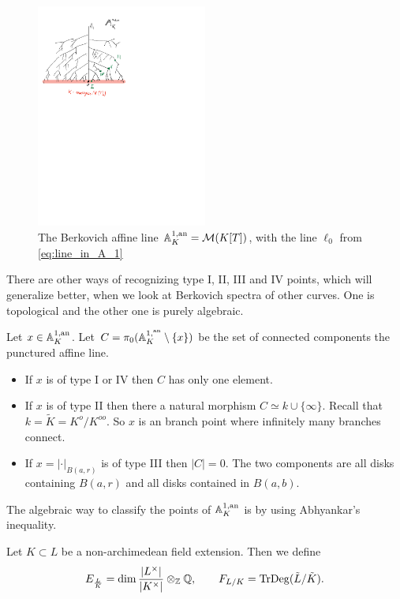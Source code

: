 \begin{figure}[h]
	\centering
	\includegraphics[width=0.5\textwidth]{figures/affine_line}
	\caption{The Berkovich affine line $\mathbb{A}_K^{1, \text{an}} = \mathcal{M} (K[T])$, with the line $\ell_0$ from \cref{eq:line_in_A_1}}
	\label{fig:affine_line}
\end{figure}

There are other ways of recognizing type I, II, III and IV points, which will generalize better, when we look at Berkovich spectra of other curves. One is topological and the other one is purely algebraic. 

\begin{proposition}
	Let $x \in \mathbb{A}_K^{1,\text{an}}$. 
	Let $C = \pi_0(\mathbb{A}_K^{1, {}^{\text{an}}}\setminus \{ x\} )$ be the set of connected components the punctured affine line. 
	\begin{itemize}
		\item If $x$ is of type I  or IV then $C$ has only one element.
		\item If $x$ is of type II then there a natural morphism $C \simeq k \cup \{\infty\} $. Recall that $k = \tilde K = K^{o} / K^{oo} $. 
			So $x$ is an branch point where infinitely many branches connect. 
		\item If $x = |\cdot |_{B(a, r)}$ is of type III then $|C| = 0$. The two components are all disks containing $B(a, r)$ and all disks contained in $B(a, b)$. 
	\end{itemize}
\end{proposition}
The algebraic way to classify the points of $\mathbb{A}_K^{1,\text{an}}$ is by using Abhyankar's inequality. 
\begin{definition}
	Let $K \subset L$ be a non-archimedean field extension. 
	Then we define \[
		E_{\frac{L}{ K}} = \dim \frac{|L^{\times }|}{|K^{\times }|} \otimes_{\mathbb{Z}} \mathbb{Q}, \qquad F_{L / K} = \operatorname{TrDeg}(\tilde L / \tilde K)
	.\] 
\end{definition}

